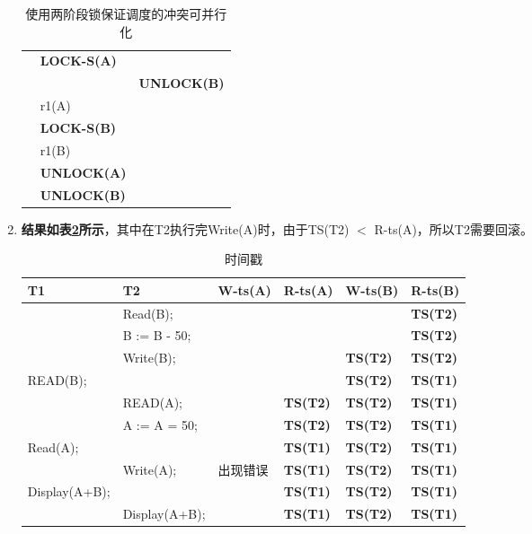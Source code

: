 \documentclass[10pt, a4paper]{article}
\begin{document}
\begin{enumerate}
\begin{table}[htb]
\begin{tabular}{l|l|l}
			&\textbf{LOCK-S(A)}&  \\
			& & \textbf{UNLOCK(B)}\\ 
				  & r1(A) &       \\
				  &\textbf{LOCK-S(B)} & \\
				  & r1(B) &       \\
			& \textbf{UNLOCK(A)} &\\
			& \textbf{UNLOCK(B)} &\\ 
			\end{tabular}
			\caption{使用两阶段锁保证调度的冲突可并行化}\label{tab:3}
			\end{table}
		\item \textbf{结果如表\ref{tab:4}所示}，其中在T2执行完Write(A)时，由于TS(T2) $<$ R-ts(A)，所以T2需要回滚。
		\begin{table}[htb]
			\centering
			\begin{tabular}{|l|l|l|l|l|l|}
			\hline
			T1            & T2            & W-ts(A) & R-ts(A)         & W-ts(B)         & R-ts(B)         \\ \hline
						  & Read(B);      &         &                 & \textbf{}       & \textbf{TS(T2)} \\ \hline
						  & B := B - 50;  &         &                 & \textbf{}       & \textbf{TS(T2)} \\ \hline
						  & Write(B);     &         &                 & \textbf{TS(T2)} & \textbf{TS(T2)} \\ \hline
			READ(B);      &               &         &                 & \textbf{TS(T2)} & \textbf{TS(T1)} \\ \hline
						  & READ(A);      &         & \textbf{TS(T2)} & \textbf{TS(T2)} & \textbf{TS(T1)} \\ \hline
						  & A := A = 50;  &         & \textbf{TS(T2)} & \textbf{TS(T2)} & \textbf{TS(T1)} \\ \hline
			Read(A);      &               &         & \textbf{TS(T1)} & \textbf{TS(T2)} & \textbf{TS(T1)} \\ \hline
						  & Write(A);     & 出现错误 & \textbf{TS(T1)} & \textbf{TS(T2)} & \textbf{TS(T1)} \\ \hline
			Display(A+B); &               &         & \textbf{TS(T1)} & \textbf{TS(T2)} & \textbf{TS(T1)} \\ \hline
						  & Display(A+B); &         & \textbf{TS(T1)} & \textbf{TS(T2)} & \textbf{TS(T1)} \\ \hline
			\end{tabular}
			\caption{时间戳}\label{tab:4}

\end{table}
\end{enumerate}
\end{document}

